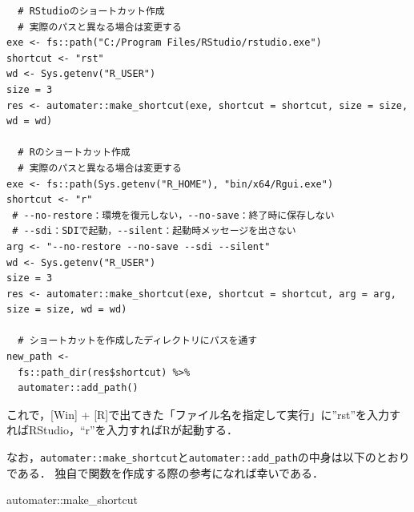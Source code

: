 \documentclass[
]{article}
\newenvironment{Shaded}{\begin{snugshade}}{\end{snugshade}}
\newcommand{\NormalTok}[1]{#1}
\newcommand{\SpecialCharTok}[1]{\textcolor[rgb]{0.00,0.00,0.00}{#1}}
\begin{document}
\begin{verbatim}
  # RStudioのショートカット作成
  # 実際のパスと異なる場合は変更する
exe <- fs::path("C:/Program Files/RStudio/rstudio.exe")
shortcut <- "rst"
wd <- Sys.getenv("R_USER")
size = 3
res <- automater::make_shortcut(exe, shortcut = shortcut, size = size, wd = wd)

  # Rのショートカット作成
  # 実際のパスと異なる場合は変更する
exe <- fs::path(Sys.getenv("R_HOME"), "bin/x64/Rgui.exe")
shortcut <- "r"
 # --no-restore：環境を復元しない，--no-save：終了時に保存しない
 # --sdi：SDIで起動，--silent：起動時メッセージを出さない
arg <- "--no-restore --no-save --sdi --silent"
wd <- Sys.getenv("R_USER")
size = 3
res <- automater::make_shortcut(exe, shortcut = shortcut, arg = arg, size = size, wd = wd)

  # ショートカットを作成したディレクトリにパスを通す
new_path <- 
  fs::path_dir(res$shortcut) %>%
  automater::add_path()
\end{verbatim}

これで，{[}Win{]} + {[}R{]}で出てきた「ファイル名を指定して実行」に''rst''を入力すればRStudio，``r''を入力すればRが起動する．

なお，\texttt{automater::make\_shortcut}と\texttt{automater::add\_path}の中身は以下のとおりである．
独自で関数を作成する際の参考になれば幸いである．

\begin{Shaded}
\begin{Highlighting}[]
\NormalTok{automater}\SpecialCharTok{::}\NormalTok{make\_shortcut}
\end{Highlighting}
\end{Shaded}
\end{document}
